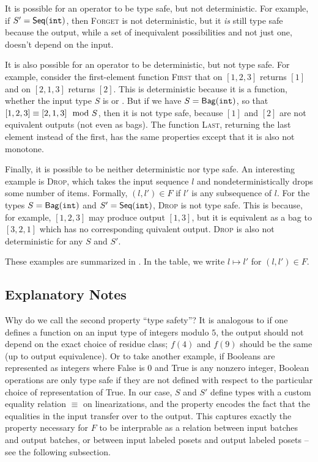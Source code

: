 It is possible for an operator to be type safe, but not deterministic. For example, if $S' = \mathsf{Seq}({\texttt{int}}){}$, then \textsc{Forget} is not deterministic, but it \emph{is} still type safe because the output, while a set of inequivalent possibilities and not just one, doesn't depend on the input.

It is also possible for an operator to be deterministic, but not type safe.
For example, consider the first-element function \textsc{First} that on $[1, 2, 3]$ returns $[1]$ and on $[2, 1, 3]$ returns $[2]$. This is deterministic because it is a function, whether the input type $S$ is \seqint{} or \relint{}. But if we have $S = \mathsf{Bag}({\texttt{int}}){}$, so that $[1, 2, 3] \equiv [2, 1, 3] \mod {S}$, then it is not type safe, because $[1]$ and $[2]$ are not equivalent outputs (not even as bags).
The function \textsc{Last}, returning the last element instead of the first, has the same properties except that it is also not monotone.

Finally, it is possible to be neither deterministic nor type safe.
An interesting example is \textsc{Drop}, which takes the input sequence $l$ and nondeterministically drops some number of items. Formally, $(l, l') \in F$ if $l'$ is any subsequence of $l$. For the types $S = \mathsf{Bag}({\texttt{int}}){}$ and $S' = \mathsf{Seq}({\texttt{int}}){}$, \textsc{Drop} is not type safe.
This is because, for example, $[1, 2, 3]$ may produce output $[1, 3]$, but it is equivalent as a bag to $[3, 2, 1]$ which has no corresponding quivalent output.
\textsc{Drop} is also not deterministic for any $S$ and $S'$.

These examples are summarized in .
In the table, we write $l \mapsto l'$ for $(l, l') \in F$.

\subsection{Explanatory Notes}

Why do we call the second property ``type safety''? It is analogous to if one defines a function on an input type of integers modulo $5$, the output should not depend on the exact choice of residue class; $f(4)$ and $f(9)$ should be the same (up to output equivalence). Or to take another example, if Booleans are represented as integers where False is $0$ and True is any nonzero integer, Boolean operations are only type safe if they are not defined with respect to the particular choice of representation of True. In our case, $S$ and $S'$ define types with a custom equality relation $\equiv$ on linearizations, and the property encodes the fact that the equalities in the input transfer over to the output. This captures exactly the property necessary for $F$ to be interprable as a relation between input batches and output batches, or between input labeled posets and output labeled posets -- see the following subsection.

